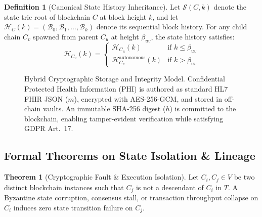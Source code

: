\documentclass[journal]{IEEEtran}
\theoremstyle{definition}
\newtheorem{definition}{Definition}
\newtheorem{theorem}{Theorem}
\begin{document}
\begin{definition}[Canonical State History Inheritance]
Let $\mathcal{S}(C, k)$ denote the state trie root of blockchain $C$ at block height $k$, and let $\mathcal{H}_C(k) = (\mathcal{B}_0, \mathcal{B}_1, \dots, \mathcal{B}_k)$ denote its sequential block history. For any child chain $C_v$ spawned from parent $C_u$ at height $\beta_{uv}$, the state history satisfies:
\begin{equation}
\mathcal{H}_{C_v}(k) = \begin{cases} 
\mathcal{H}_{C_u}(k) & \text{if } k \le \beta_{uv} \\
\mathcal{H}_{C_v}^{\text{autonomous}}(k) & \text{if } k > \beta_{uv}
\end{cases}
\end{equation}
\end{definition}

\begin{figure}[t]
\centering

\caption{Hybrid Cryptographic Storage and Integrity Model. Confidential Protected Health Information (PHI) is authored as standard HL7 FHIR JSON ($m$), encrypted with AES-256-GCM, and stored in off-chain vaults. An immutable SHA-256 digest ($h$) is committed to the blockchain, enabling tamper-evident verification while satisfying GDPR Art.~17.}
\label{fig:crypto}
\end{figure}

\subsection{Formal Theorems on State Isolation \& Lineage}

\begin{theorem}[Cryptographic Fault \& Execution Isolation]
\label{thm:isolation}
Let $C_i, C_j \in V$ be two distinct blockchain instances such that $C_j$ is not a descendant of $C_i$ in $T$. A Byzantine state corruption, consensus stall, or transaction throughput collapse on $C_i$ induces zero state transition failure on $C_j$.
\end{theorem}
\end{document}
